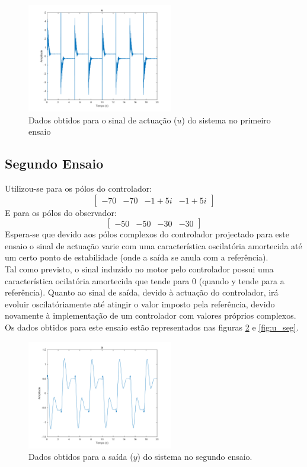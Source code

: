 \documentclass[%
  reprint,
  nofootinbib,
  amsmath,amssymb,
  aps,
  10pt,
  a4paper
]{revtex4-1}
\begin{document}
\begin{figure}
\includegraphics[width=2.5in]{../imgs/dados_00_a/dados_00_a_u.png}
\caption{Dados obtidos para o sinal de actuação ($u$) do sistema no primeiro ensaio}
\label{fig:u_pri}
\end{figure}
\subsection{Segundo Ensaio}
Utilizou-se para os pólos do controlador:
\begin{equation}
\begin{bmatrix}
-70 & -70  & -1+5i &-1+5i
\end{bmatrix}
\end{equation}
E para os pólos do observador:
\begin{equation}
\begin{bmatrix}
-50 & -50  & -30 &-30
\end{bmatrix}
\end{equation}
Espera-se que devido aos pólos complexos do controlador projectado para este ensaio o sinal de actuação varie com uma característica oscilatória amortecida até um certo ponto de estabilidade (onde a saída se anula com a referência).\\
Tal como previsto, o sinal induzido no motor pelo controlador possui uma característica ocilatória amortecida que tende para 0 (quando y tende para a referência).
Quanto ao sinal de saída, devido à actuação do controlador, irá evoluir oscilatóriamente até atingir o valor imposto pela referência, devido novamente à implementação de um controlador com valores próprios complexos.
Os dados obtidos para este ensaio estão representados nas figuras \ref{fig:y_seg} e \ref{fig:u_seg}.
\begin{figure}
\includegraphics[width=2.5in]{../imgs/dados_00_c/dados_00_c_y.png}
\caption{Dados obtidos para a saída ($y$) do sistema no segundo ensaio.}
\label{fig:y_seg}
\end{figure}
\end{document}
